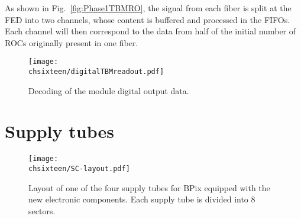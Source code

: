As shown in Fig.~\ref{fig:Phase1TBMRO}, the signal from each fiber is split at the FED into two channels, whose content is buffered and processed in the FIFOs.
Each channel will then correspond to the data from half of the initial number of ROCs originally present in one fiber.

\begin{figure}[!htb]
 \begin{center}
 \texttt{[image: \\chsixteen/digitalTBMreadout.pdf]}
 \end{center}
 \caption{Decoding of the module digital output data.}
 \label{fig:digTBMRO}
\end{figure}

\section{Supply tubes}

\begin{figure}[!htb]
 \begin{center}
 \texttt{[image: \\chsixteen/SC-layout.pdf]}
 \end{center}
 \caption{Layout of one of the four supply tubes for BPix equipped with the new electronic components. Each supply tube is divided into 8 sectors.}
 \label{fig:phase1SC}
\end{figure}

